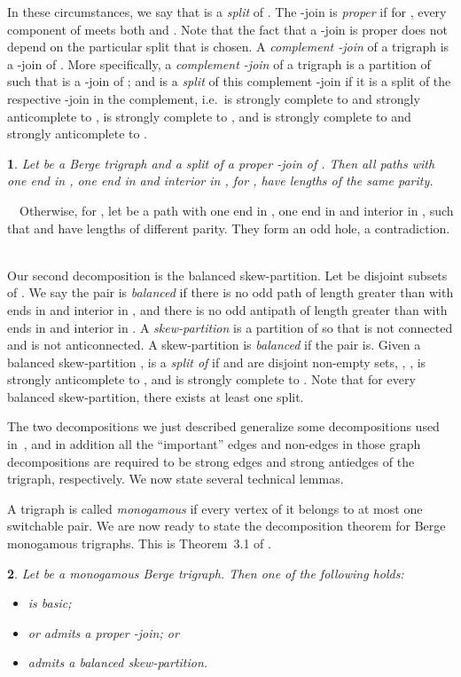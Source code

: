 \documentclass[11 pt] {article}
\newcommand\blackslug{\hbox{\hskip 1pt \vrule width 4pt height 8pt depth 1.5pt
        \hskip 1pt}}
\newcommand\bbox{\hfill \quad \blackslug \medbreak}
\newtheorem{theorem}{}[section]
\newcounter{claim}
\newcommand{\Proof}{\setcounter{claim}{0}\noindent{\bf Proof.}\ \ }
\begin{document}
In these circumstances, we say that 
is a \emph{split} of . The -join is \emph{proper} if
for , every component of  meets both  and
. Note that the fact that a -join is proper does not depend on
the particular split that is chosen. A \emph{complement -join} of a
trigraph  is a -join of .  More specifically, a
{\em complement -join} of a trigraph  is a partition 
of  such that  is a -join of ; and
 is a {\em split} of this complement -join
if it is a split of the respective -join in the complement, i.e.\
 is strongly complete to  and strongly anticomplete
to ,  is strongly complete to , and  is strongly
complete to  and strongly anticomplete to .


\begin{theorem}
 \label{l:par2Join} Let  be a Berge trigraph and  a split of a proper -join of . Then all paths
with one end in , one end in  and interior in , for
, have lengths of the same parity.
\end{theorem}

\Proof Otherwise, for , let  be a path with one end in
, one end in  and interior in , such that  and
 have lengths of different parity. They form an odd hole, a
contradiction. \bbox


Our second decomposition is the balanced skew-partition. Let 
be disjoint subsets of . We say the pair  is {\em
 balanced} if there is no odd path of length greater than  with
ends in  and interior in , and there is no odd antipath of
length greater than  with ends in  and interior in . A {\em
 skew-partition} is a partition  of  so that  is not
connected and  is not anticonnected. A skew-partition  is {\em balanced} if the pair  is. 
Given a balanced skew-partition ,  is a
\emph{split of } if  and  are disjoint
non-empty sets, , ,  is strongly
anticomplete to , and  is strongly complete to . Note
that for every balanced skew-partition, there exists at least one
split.


The two decompositions we just described generalize some
decompositions used in~\cite{CRST}, and in addition all the
``important'' edges and non-edges in those graph decompositions are
required to be strong edges and strong antiedges of the trigraph,
respectively.  We now state several technical lemmas.


A trigraph is called {\em monogamous} if every vertex of it belongs to
at most one switchable pair. We are now ready to state the
decomposition theorem for Berge monogamous trigraphs. This is
Theorem~3.1 of \cite{trigraphs}.
\begin{theorem} 
\label{noMjointri}
Let  be a monogamous Berge trigraph. Then one of the following holds:
\begin{itemize}
\item  is basic;
\item  or  admits a proper -join; or 
\item  admits a balanced skew-partition.
\end{itemize}
\end{theorem}
\end{document}
